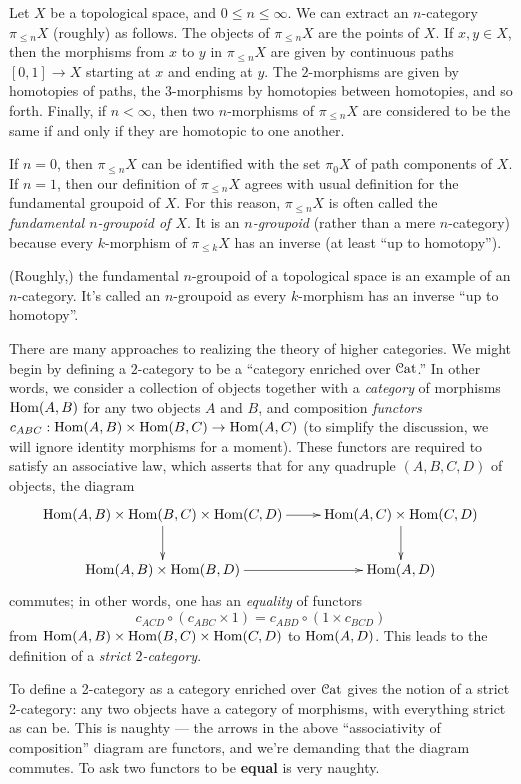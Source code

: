 \begin{1.1.1 Goals and Obstacles}
\begin{example}\label{grape}
Let $X$ be a topological space, and $0 \leq n \leq \infty$. We
can extract an $n$-category $\pi_{\leq n} X$ (roughly) as follows.
The objects of $\pi_{\leq n} X$ are the points of $X$. If $x,y \in
X$, then the morphisms from $x$ to $y$ in $\pi_{\leq n} X$ are
given by continuous paths $[0,1] \rightarrow X$ starting at $x$
and ending at $y$. The $2$-morphisms are given by homotopies of
paths, the $3$-morphisms by homotopies between homotopies, and so
forth. Finally, if $n < \infty$, then two $n$-morphisms of
$\pi_{\leq n} X$ are considered to be the same if and only if they are homotopic to one another.

If $n = 0$, then $\pi_{\leq n} X$ can be identified with the set $\pi_0 X$ of path
components of $X$. If $n=1$, then our definition of $\pi_{\leq n}
X$ agrees with usual definition for the fundamental groupoid of
$X$. For this reason, $\pi_{\leq n} X$ is often called the {\it
fundamental $n$-groupoid of $X$}. It is an {\it $n$-groupoid} (rather than a mere $n$-category) 
because every $k$-morphism of $\pi_{\leq k} X$ has an inverse (at least ``up to
homotopy'').
\end{example}
\begin{shaded}
(Roughly,) the fundamental $n$-groupoid of a topological space is an example of an $n$-category. It's called an $n$-groupoid as every $k$-morphism has an inverse ``up to homotopy''.
\end{shaded}

There are many approaches to realizing the theory of higher categories.
We might begin by defining a $2$-category to be a
``category enriched over $\operatorname{\mathcal{C}at}$.'' In other words, we consider a
collection of objects together with a {\em category} of morphisms
$\operatorname{Hom}(A,B)$ for any two objects $A$ and $B$, and composition {\em
functors} $c_{ABC}: \operatorname{Hom}(A,B) \times \operatorname{Hom}(B,C) \rightarrow
\operatorname{Hom}(A,C)$ (to simplify the discussion, we will ignore identity
morphisms for a moment). These functors are required to satisfy an
associative law, which asserts that for any quadruple $(A,B,C,D)$
of objects, the diagram
$$ \xymatrix{ \Hom(A,B) \times \Hom(B,C) \times \Hom(C,D) \ar[d]
 \ar[r] & \Hom(A,C) \times \Hom(C,D) \ar[d] \\
 \Hom(A,B) \times \Hom(B,D) \ar[r] & \Hom(A,D) }$$
 commutes; in other words, one has an {\em equality} of functors
$$c_{ACD} \circ (c_{ABC} \times 1) = c_{ABD} \circ (1
\times c_{BCD})$$
from $\operatorname{Hom}(A,B) \times \operatorname{Hom}(B,C) \times
\operatorname{Hom}(C,D)$ to $\operatorname{Hom}(A,D)$. This leads to the definition of
a {\it strict $2$-category}.
\begin{shaded}
To define a 2-category as a category enriched over $\operatorname{\mathcal{C}at}$ gives the notion of a strict 2-category: any two objects have a category of morphisms, with everything strict as can be. This is naughty --- the arrows in the above ``associativity of composition'' diagram are functors, and we're demanding that the diagram commutes. To ask two functors to be \textbf{equal} is very naughty.


\end{shaded}
\end{1.1.1 Goals and Obstacles}
